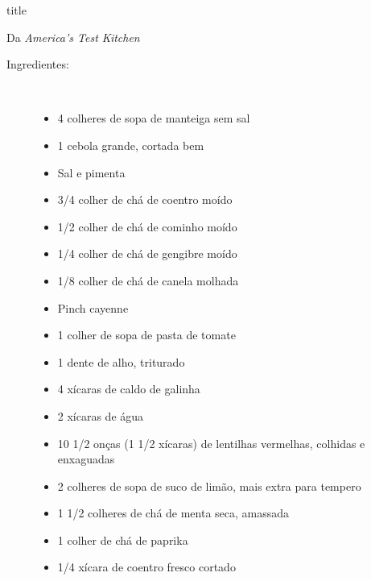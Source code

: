\documentclass [11pt, letterpaper] {article}
\begin{document}
 {title}

\begin {flushright}
Da {\it America's Test Kitchen}
\end {flushright}

\begin {description}

\item [Ingredientes:] \ \\
\begin {itemize}
\item 4 colheres de sopa de manteiga sem sal
\item 1 cebola grande, cortada bem
\item Sal e pimenta
\item 3/4 colher de chá de coentro moído
\item 1/2 colher de chá de cominho moído
\item 1/4 colher de chá de gengibre moído
\item 1/8 colher de chá de canela molhada
\item Pinch cayenne
\item 1 colher de sopa de pasta de tomate
\item 1 dente de alho, triturado
\item 4 xícaras de caldo de galinha
\item 2 xícaras de água
\item 10 1/2 onças (1 1/2 xícaras) de lentilhas vermelhas, colhidas e enxaguadas
\item 2 colheres de sopa de suco de limão, mais extra para tempero
\item 1 1/2 colheres de chá de menta seca, amassada
\item 1 colher de chá de paprika
\item 1/4 xícara de coentro fresco cortado
\end {itemize}


\end{description}
\end{document}
